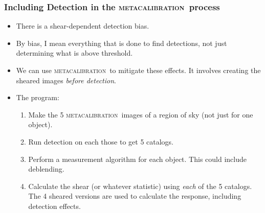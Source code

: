 \documentclass{beamer}
\newcommand{\mcal}{\textsc{metacalibration}}
\begin{document}
\frame
{
    \frametitle{Including Detection in the \mcal\ process}

 
    \begin{itemize}

        \item There is a {\color{lightsteelblue} shear-dependent detection bias}.

        \item By bias, I mean everything that is done to find detections,
            not just determining what is above threshold.

        \item We can use \mcal\ to mitigate these effects. It involves
            creating the sheared images {\color{lightsteelblue} {\em before detection}}.

        \item The program:
            \begin{enumerate}

                \item Make the 5 \mcal\ images of a region of sky (not just for
                    one object).

                \item Run detection on each those to get 5 catalogs.

                \item Perform a measurement algorithm for each object.  This
                    could include deblending.

                \item Calculate the shear (or whatever statistic) using {\em
                    each} of the 5 catalogs.  The 4 sheared versions are used
                    to calculate the response, including detection effects.

            \end{enumerate}

    \end{itemize}

}
\end{document}
